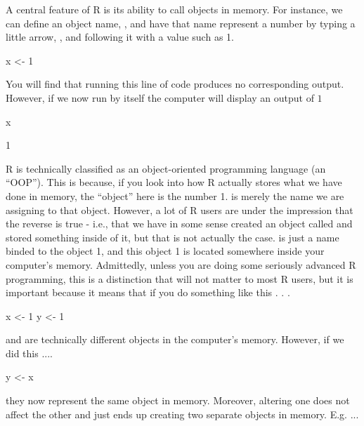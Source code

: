 A central feature of R is its ability to call objects in memory. For instance, we can define an object name, , and have that name represent a number by typing a little arrow, \R{<-}, and following it with a value such as 1.

\begin{inR}
x <- 1
\end{inR}

\vspace{1em}

You will find that running this line of code produces no corresponding output.  However, if we now run  by itself the computer will display an output of $1$

\begin{inR}
x
\end{inR}

\begin{outR}
[1] 1
\end{outR}

R is technically classified as an object-oriented programming language (an ``OOP''). This is because, if you look into how R actually stores what we have done in memory, the ``object'' here is the number 1.   is merely the name we are assigning to that object. However, a lot of R users are under the impression that the reverse is true - i.e., that we have in some sense created an object called  and stored something inside of it, but that is not actually the case.  is just a name binded to the object 1, and this object 1 is located somewhere inside your computer's memory. Admittedly, unless you are doing some seriously advanced R programming, this is a distinction that will not matter to most R users, but it is important because it means that if you do something like this . . . 

\begin{inR}
x <- 1
y <- 1
\end{inR}

\vspace{1em}

\noindent {} and  are technically different objects in the computer's memory.  However, if we did this ....

\begin{inR}
y <- x
\end{inR}

\vspace{1em}

\noindent they now represent the same object in memory. Moreover, altering one does not affect the other and just ends up creating two separate objects in memory. E.g. ...

